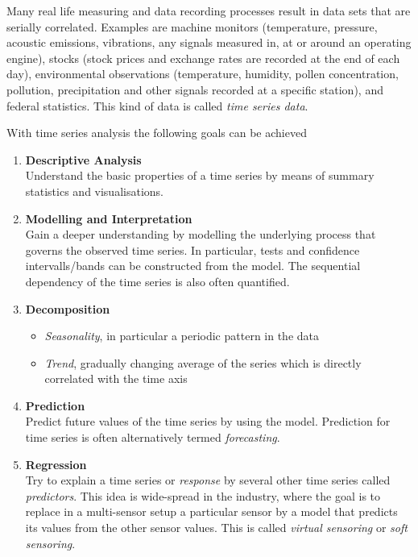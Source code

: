 \documentclass[11pt]{article}
\theoremstyle{definition}
\begin{document}
Many real life measuring and data recording processes result in data sets that are serially correlated. Examples are machine monitors (temperature, pressure, acoustic emissions, vibrations, any signals measured in, at or around an operating engine), stocks (stock prices and exchange rates are recorded at the end of each day), environmental observations (temperature, humidity, pollen concentration, pollution, precipitation and other signals recorded at a specific station), and federal statistics. This kind of data is called \emph{time series data}. 

With time series analysis the following goals can be achieved
\begin{enumerate}
	\item \textbf{Descriptive Analysis}\\
	Understand the basic properties of a time series by means of summary statistics and visualisations.
	\item \textbf{Modelling and Interpretation}\\
	Gain a deeper understanding by modelling the underlying process that governs the observed time series. In particular, tests and confidence intervalls/bands can be constructed from the model. The sequential dependency of the time series is also often quantified.
	\item \textbf{Decomposition}
	\begin{itemize}
		\item \emph{Seasonality}, in particular a periodic pattern in the data
		\item \emph{Trend}, gradually changing average of the series which is directly correlated with the time axis
	\end{itemize}
	\item \textbf{Prediction}\\
	Predict future values of the time series by using the model. Prediction for time series is often alternatively termed \emph{forecasting}.
	\item \textbf{Regression}\\
	Try to explain a time series or \emph{response} by several other time series called \emph{predictors}. This idea is wide-spread in the industry, where the goal is to replace in a multi-sensor setup a particular sensor by a model that predicts its values from the other sensor values. This is called \emph{virtual sensoring} or \emph{soft sensoring}.
\end{enumerate}
\end{document}
